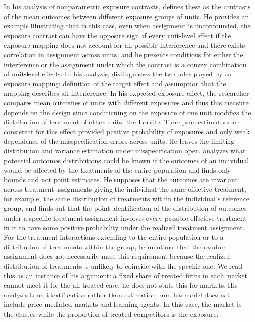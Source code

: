 \documentclass[11pt]{article}
\begin{document}
In his analysis of nonparametric exposure contrasts, \citet{leung2026} defines these as the contrasts of the mean outcomes between different exposure groups of units. He provides an example illustrating that in this case, even when assignment is unconfounded, the exposure contrast can have the opposite sign of every unit-level effect if the exposure mapping does not account for all possible interference and there exists correlation in assignment across units, and he presents conditions for either the interference or the assignment under which the contrast is a convex combination of unit-level effects. In his analysis, \citet{savje2024} distinguishes the two roles played by an exposure mapping: definition of the target effect and assumption that the mapping describes all interference. In his expected exposure effect, the researcher compares mean outcomes of units with different exposures and thus this measure depends on the design since conditioning on the exposure of one unit modifies the distribution of treatment of other units; the Horvitz--Thompson estimators are consistent for this effect provided positive probability of exposures and only weak dependence of the misspecification errors across units. He leaves the limiting distribution and variance estimation under misspecification open. \citet{manski2013} analyzes what potential outcomes distributions could be known if the outcomes of an individual would be affected by the treatments of the entire population and finds only bounds and not point estimates. He supposes that the outcomes are invariant across treatment assignments giving the individual the same effective treatment, for example, the same distribution of treatments within the individual's reference group, and finds out that the point identification of the distribution of outcomes under a specific treatment assignment involves every possible effective treatment in it to have some positive probability under the realized treatment assignment. For the treatment interactions extending to the entire population or to a distribution of treatments within the group, he mentions that the random assignment does not necessarily meet this requirement because the realized distribution of treatments is unlikely to coincide with the specific one. We read this as an instance of his argument: a fixed share of treated firms in each market cannot meet it for the all-treated case; he does not state this for markets. His analysis is on identification rather than estimation, and his model does not include price-mediated markets and learning agents. In this case, the market is the cluster while the proportion of treated competitors is the exposure.
\end{document}
